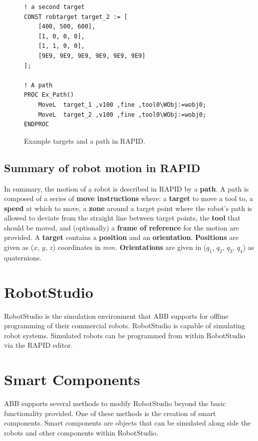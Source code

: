 \documentclass{cslthse-msc}
\begin{document}
\lstset{language=RAPID}
\begin{figure}[H]
\centering
\begin{lstlisting}
! a second target
CONST robtarget target_2 := [ 
    [400, 500, 600], 
    [1, 0, 0, 0], 
    [1, 1, 0, 0], 
    [9E9, 9E9, 9E9, 9E9, 9E9, 9E9] 
];
    
! A path
PROC Ex_Path()
    MoveL  target_1 ,v100 ,fine ,tool0\WObj:=wobj0;
    MoveL  target_2 ,v100 ,fine ,tool0\WObj:=wobj0;
ENDPROC
\end{lstlisting}
\caption{Example targets and a path in RAPID.}
\label{fig:RAPID_target_path}
\end{figure}

\subsection{Summary of robot motion in RAPID}
\label{sec:Tech_Back:Rob_Move:summary}
In summary, the motion of a robot is described in RAPID by a \textbf{path}. A path is composed of a series of \textbf{move instructions} where: a \textbf{target} to move a tool to, a \textbf{speed} at which to move, a \textbf{zone} around a target point where the robot's path is allowed to deviate from the straight line between target points, the \textbf{tool} that should be moved, and (optionally) a \textbf{frame of reference} for the motion are provided. A \textbf{target} contains a \textbf{position} and an \textbf{orientation}. \textbf{Positions} are given as ($x$, $y$, $z$) coordinates in $mm$. \textbf{Orientations} are given in ($q_1$, $q_2$, $q_3$, $q_4$) as quaternions. 


\newpage
\section{RobotStudio}
\label{sec:Tech_Back:RobotStudio}
RobotStudio is the simulation environment that ABB supports for offline programming of their commercial robots. RobotStudio is capable of simulating robot systems. Simulated robots can be programmed from within RobotStudio via the RAPID editor. 

\section{Smart Components}
\label{sec:Tech_Back:Smart_Comp}
ABB supports several methods to modify RobotStudio beyond the basic functionality provided. One of these methods is the creation of smart components. Smart components are objects that can be simulated along side the robots and other components within RobotStudio. 
\end{document}
